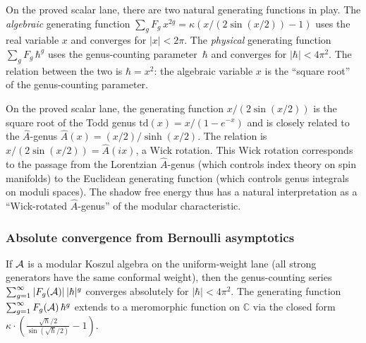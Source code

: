 \begin{remark}
\label{rem:thqg-I-two-gfs}
On the proved scalar lane, there are two natural generating functions
in play. The \emph{algebraic} generating function
$\sum_g F_g\,x^{2g} = \kappa(x/(2\sin(x/2)) - 1)$ uses the real
variable $x$ and converges for $|x| < 2\pi$. The \emph{physical}
generating function $\sum_g F_g\,\hbar^g$ uses the genus-counting
parameter~$\hbar$ and converges for $|\hbar| < 4\pi^2$. The relation
between the two is $\hbar = x^2$: the algebraic variable $x$ is the
``square root'' of the genus-counting parameter.
\end{remark}

\begin{remark}
\label{rem:thqg-I-ahat-connection}
On the proved scalar lane, the generating function $x/(2\sin(x/2))$ is
the square root of the Todd genus $\mathrm{td}(x) = x/(1-e^{-x})$ and
is closely related to the $\hat{A}$-genus $\hat{A}(x) = (x/2)/\sinh(x/2)$.
The relation is $x/(2\sin(x/2)) = \hat{A}(ix)$, a Wick rotation. This
Wick rotation corresponds to the passage from the Lorentzian
$\hat{A}$-genus (which controls index theory on spin manifolds) to the
Euclidean generating function (which controls genus integrals on moduli
spaces). The shadow free energy thus has a natural interpretation as a
``Wick-rotated $\hat{A}$-genus'' of the modular characteristic.
\end{remark}

\subsubsection{Absolute convergence from Bernoulli asymptotics}

\begin{theorem}
\label{thm:thqg-I-absolute-convergence}
If $\mathcal{A}$ is a modular Koszul algebra on the uniform-weight lane (all strong generators have the same conformal weight), then the
genus-counting series $\sum_{g=1}^{\infty} |F_g(\mathcal{A})|\,|\hbar|^g$
converges absolutely for $|\hbar| < 4\pi^2$. The generating function
$\sum_{g=1}^{\infty} F_g(\mathcal{A})\,\hbar^g$ extends to a meromorphic
function on $\mathbb{C}$ via the closed form
$\kappa \cdot (\frac{\sqrt{\hbar}/2}{\sin(\sqrt{\hbar}/2)} - 1)$.
\end{theorem}

